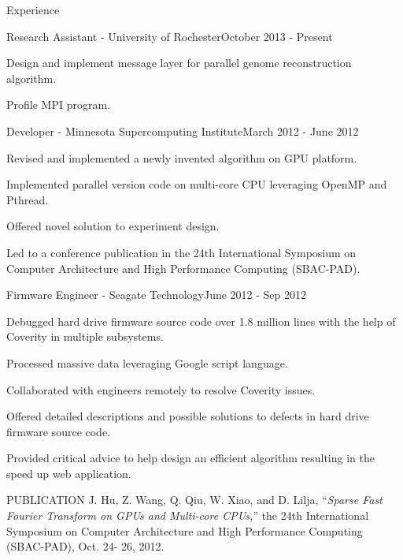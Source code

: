 \documentclass{resume} %
\begin{document}
\begin{rSection}{Experience}

\begin{rSubsection}{Research Assistant - University of Rochester}{October 2013 - Present}{}{}
\item Design and implement message layer for parallel genome reconstruction algorithm.
\item Profile MPI program. 
\end{rSubsection}


\begin{rSubsection}{Developer - Minnesota Supercomputing Institute}{March 2012 - June 2012}{}{}
\item Revised and implemented a newly invented algorithm on GPU platform.
\item Implemented parallel version code on multi-core CPU leveraging OpenMP and Pthread.
\item Offered novel solution to experiment design.
\item Led to a conference publication in the 24th International Symposium on Computer Architecture and High Performance Computing (SBAC-PAD).
\end{rSubsection}


\begin{rSubsection}{Firmware Engineer - Seagate Technology}{June 2012 - Sep 2012}{}{}
\item Debugged hard drive firmware source code over 1.8 million lines with the help of Coverity in multiple subsystems.
\item Processed massive data leveraging Google script language.
\item Collaborated with engineers remotely to resolve Coverity issues.
\item Offered detailed descriptions and possible solutions to defects in hard drive firmware source code.
\item Provided critical advice to help design an efficient algorithm resulting in the speed up web application.
\end{rSubsection}

\end{rSection}


\begin{rSection}{PUBLICATION}
J. Hu, Z. Wang, Q. Qiu, W. Xiao, and D. Lilja, “\textit{Sparse Fast Fourier Transform on GPUs and Multi-core CPUs,}” the 24th International Symposium on Computer Architecture and High Performance Computing (SBAC-PAD), Oct. 24- 26, 2012.
\end{rSection}
\end{document}
